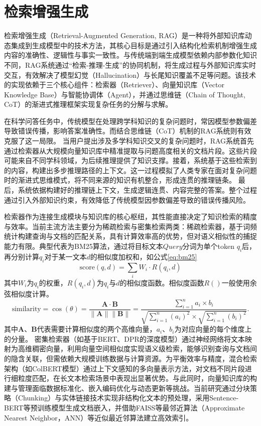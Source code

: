 \section{检索增强生成}
检索增强生成（Retrieval-Augmented Generation, RAG）\cite{karpukhin2020dense,izacard2023atlas,yao2023editing,feng2023trends,xu2023retrieval,balaguer2024rag}是一种将外部知识库动态集成到生成模型中的技术方法，其核心目标是通过引入结构化检索机制增强生成内容的准确性、逻辑性与事实一致性。与传统端到端生成模型依赖内部参数化知识不同，RAG系统通过“检索-推理-生成”的协同机制，将生成过程与外部知识库实时交互，有效解决了模型幻觉（Hallucination）与长尾知识覆盖不足等问题。该技术的实现依赖于三个核心组件：检索器（Retriever）、向量知识库（Vector Knowledge Base）与智能协调体（Agent），并通过思维链（Chain of Thought, CoT）的渐进式推理框架实现复杂任务的分解与求解。

在科学问答任务中，传统模型在处理跨学科知识的复杂问题时，常因模型参数偏差导致错误传播，影响答案准确性。而结合思维链（CoT）机制的RAG系统则有效克服了这一局限。
当用户提出涉及多学科知识交叉的复杂问题时，RAG系统首先通过检索器从大规模向量知识库中精准提取与问题高度相关的文档片段。这些片段可能来自不同学科领域，为后续推理提供了知识支撑。接着，系统基于这些检索到的内容，构建出多步推理路径的上下文。这一过程模拟了人类专家在面对复杂问题时的渐进式思维模式，将不同来源的知识有机整合，形成连贯的推理链条。
最后，系统依据构建好的推理链上下文，生成逻辑连贯、内容完整的答案。整个过程通过引入外部知识约束，有效降低了传统模型因参数偏差导致的错误传播风险。

检索器作为连接生成模块与知识库的核心枢纽，其性能直接决定了知识检索的精度与效率。当前主流方法主要分为稀疏检索与密集检索两类：稀疏检索器，基于词频统计构建查询与文档的匹配关系，具有计算效率高的优势，但对语义相似性的捕捉能力有限。典型代表为BM25\cite{robertson2009probabilistic}算法，通过将目标文本$Query$分词为单个token $q_i$后，再分别计算$q_i$对于某一文本$d$的相似度加权和，如公式\ref{eq:bm25}
\begin{equation}
  \label{eq:bm25}
  \text{score}(q, d) = \sum_{i} W_i \cdot R(q_i, d)
  \end{equation}
其中$W_i$为$q_i$的权重，$R(q_i, d)$为$q_i$与$d$的相似度函数。相似度函数$R()$一般使用余弦相似度计算。
\begin{equation}
  \text{similarity} = \cos(\theta) = \frac{\mathbf{A} \cdot \mathbf{B}}{\|\mathbf{A}\|\|\mathbf{B}\|} = \frac{\sum_{i=1}^{n} a_i \times b_i}{\sqrt{\sum_{i=1}^{n} (a_i)^2} \times \sqrt{\sum_{i=1}^{n} (b_i)^2}}.
  \end{equation}
其中$\mathbf{A}$、$\mathbf{B}$代表需要计算相似度的两个高维向量，$a_i$、$b_i$为对应向量的每个维度上的分量。
密集检索器（如基于BERT、DPR的深度模型）通过神经网络将文本映射为高维稠密向量，利用向量空间相似度实现语义级检索，能够识别查询与文档间的隐含关联，但需依赖大规模训练数据与计算资源。为平衡效率与精度，混合检索架构（如ColBERT模型）通过上下文感知的多向量表示方法，对文档不同片段进行细粒度匹配，在长文本检索场景中表现出显著优势。与此同时，向量知识库的构建与管理面临数据标准化、嵌入编码优化与动态更新等挑战。当前研究通过分块策略（Chunking）与实体链接技术实现非结构化文本的预处理，采用Sentence-BERT等预训练模型生成文档嵌入，并借助FAISS等最邻近算法（Approximate Nearest Neighbor，ANN）等近似最近邻算法建立高效索引。

